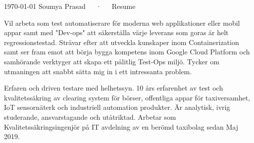 \documentclass[12pt, a4paper]{awesome-cv}
\begin{document}
\makecvheader

\makecvfooter
  {\today}
  {Soumya Prasad~~~·~~~Resume}
  {\thepage}

\begin{cvparagraph}

    Vil arbeta som test automatiserare för moderna web applikationer eller mobil appar samt med "Dev-ops" att säkerställa
    värje leverans som goras är helt regressionstestad. Strävar efter att utveckla kunskaper inom Containerization samt ser fram
    emot att börja bygga kompetens inom Google Cloud Platform och samhörande verktyger att skapa ett pålitlig Test-Ops miljö.
    Tycker om utmaningen att snabbt sätta mig in i ett intressanta problem.
\end{cvparagraph}

\begin{cvparagraph}

    Erfaren och driven testare med helhetssyn. 10 års erfarenhet av test och kvalitetssäkring av
    clearing system för börser, offentliga appar för taxiversamhet, IoT sensornäterk och industriell automation produkter.
    Är analytisk, ivrig studerande, ansvarstagande och utåtriktad.
    Arbetar som Kvalitetssäkringsingenjör på IT avdelning av en berömd taxibolag sedan Maj 2019.
\end{cvparagraph}
\end{document}
